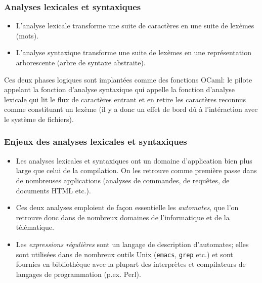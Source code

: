 
%
\begin{frame}
\frametitle{Analyses lexicales et syntaxiques}

\begin{itemize}

  \item L'analyse lexicale transforme une suite de
  caractères en une suite de lexèmes (mots).

  \item L'analyse syntaxique transforme une suite de
  lexèmes en une représentation arborescente (arbre de syntaxe
  abstraite).

\end{itemize}
Ces deux phases logiques sont implantées comme des fonctions OCaml:
le pilote appelant la fonction d'analyse syntaxique qui appelle la
fonction d'analyse lexicale qui lit le flux de caractères entrant et
en retire les caractères reconnus comme constituant un lexème (il y a
donc un effet de bord dû à l'intéraction avec le système de fichiers).

\end{frame}

%
\begin{frame}
\frametitle{Enjeux des analyses lexicales et syntaxiques}

\begin{itemize}

  \item Les analyses lexicales et syntaxiques ont un domaine
  d'application bien plus large que celui de la compilation. On les
  retrouve comme première passe dans de nombreuses applications
  (analyses de commandes, de requêtes, de documents HTML etc.).

  \item Ces deux analyses emploient de façon essentielle les
  \emph{automates}, que l'on retrouve donc dans de nombreux domaines
  de l'informatique et de la télématique.

  \item Les \emph{expressions régulières} sont un langage de
  description d'automates; elles sont utilisées dans de nombreux
  outils Unix (\texttt{emacs}, \texttt{grep} etc.) et sont fournies en
  bibliothèque avec la plupart des interprètes et compilateurs de
  langages de programmation (p.ex. \textsf{Perl}).

\end{itemize}

\end{frame}

